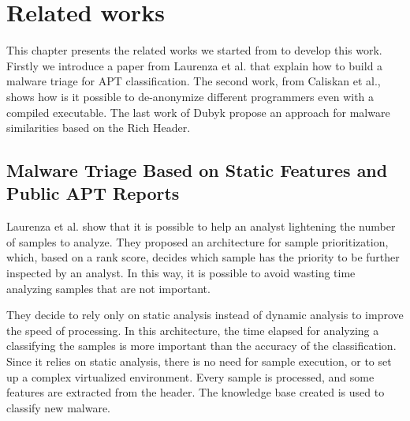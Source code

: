 \chapter{Related works}

This chapter presents the related works we started from to develop this work. Firstly we introduce a paper from Laurenza et al. that explain how to build a malware triage for APT classification. The second work, from Caliskan et al., shows how is it possible to de-anonymize different programmers even with a compiled executable. The last work of Dubyk propose an approach for malware similarities based on the Rich Header.

\section{Malware Triage Based on Static Features and Public APT Reports}
Laurenza et al. show that it is possible to help an analyst lightening the number of samples to analyze. They proposed an architecture for sample prioritization, which, based on a rank score, decides which sample has the priority to be further inspected by an analyst. In this way, it is possible to avoid wasting time analyzing samples that are not important. 

They decide to rely only on static analysis instead of dynamic analysis to improve the speed of processing. In this architecture, the time elapsed for analyzing a classifying the samples is more important than the accuracy of the classification. Since it relies on static analysis, there is no need for sample execution, or to set up a complex virtualized environment. Every sample is processed, and some features are extracted from the header. The knowledge base created is used to classify new malware.

